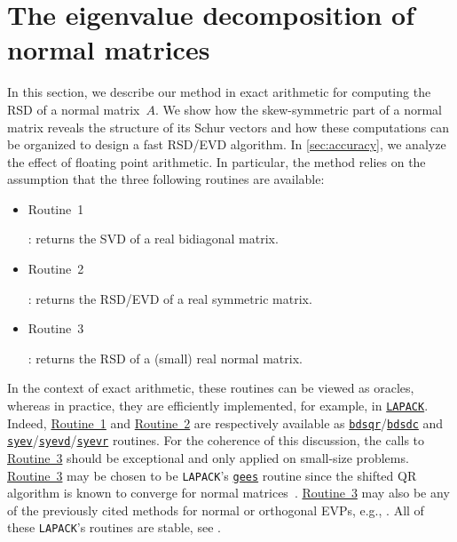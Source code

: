\documentclass[10pt,twoside,dvipsnames]{siamart1116}
\numberwithin{algorithm}{section}
\numberwithin{equation}{section}
\newcommand{\wordlabel}[2]{\hypertarget{#1}{#2}}
\newcommand{\wordref}[2]{\hyperlink{#1}{#2}}
\begin{document}
\section{The eigenvalue decomposition of normal matrices}\label{sec:normal_EVP}
In this section, we describe our method in exact arithmetic for computing the RSD of a normal matrix~$A$. We show how the skew-symmetric part of a normal matrix reveals the structure of its Schur vectors and how these computations can be organized to design a fast RSD/EVD algorithm. In \cref{sec:accuracy}, we analyze the effect of floating point arithmetic. In particular, the method relies on the assumption that the three following routines are available:
\begin{itemize}
	\item \wordlabel{oracle1}{Routine~1}: returns the SVD of a real bidiagonal matrix.
	\item \wordlabel{oracle2}{Routine~2}: returns the RSD/EVD of a real symmetric matrix.
	\item \wordlabel{oracle3}{Routine~3}: returns the RSD of a (small) real normal matrix.
\end{itemize}
In the context of exact arithmetic, these routines can be viewed as oracles, whereas in practice, they are efficiently implemented, for example, in \href{https://www.netlib.org/lapack/explore-html/index.html}{\texttt{LAPACK}}. Indeed, \wordref{oracle1}{Routine~1} and \wordref{oracle2}{Routine~2} are respectively available as \href{https://www.netlib.org/lapack//explore-html/d6/d51/group__bdsqr_gade20fbf9c91aa7de0c3d565b39588dc5.html}{\texttt{bdsqr}}/\href{https://www.netlib.org/lapack/explore-html/d2/d37/group__bdsdc_ga343a26845ae796e1f95f0ff7e1b0af2d.html}{\texttt{bdsdc}} and \href{https://www.netlib.org/lapack/explore-html/d8/d1c/group__heev_ga8995c47a7578fef733189df3490258ff.html}{\texttt{syev}}/\href{https://www.netlib.org/lapack/explore-html/d8/d30/group__heevd_ga25b71a69f9921df0a6050aa5883f54f4.html}{\texttt{syevd}}/\href{https://www.netlib.org/lapack/explore-html/d1/d56/group__heevr_gaa334ac0c11113576db0fc37b7565e8b5.html}{\texttt{syevr}} routines. For the coherence of this discussion, the calls to \wordref{oracle3}{Routine~3} should be exceptional and only applied on small-size problems. \wordref{oracle3}{Routine~3} may be chosen to be \texttt{LAPACK}'s \href{https://www.netlib.org/lapack//explore-html/d5/d38/group__gees_gab48df0b5c60d7961190d868087f485bc.html}{\texttt{gees}} routine since the shifted QR algorithm is known to converge for normal matrices~\cite{BATTERSON1994181}. \wordref{oracle3}{Routine~3} may also be any of the previously cited methods for normal or orthogonal EVPs, e.g., \cite{AmmarReichel86,wanggragg01,ZhouBrent03}. All of these \texttt{LAPACK}'s routines are stable, see \cite{lapack99}.
\end{document}
